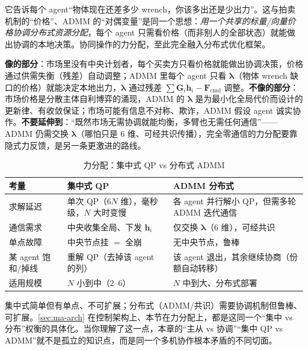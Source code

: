 \begin{insight}
它告诉每个 agent“物体现在还差多少 wrench，你该多出还是少出力”。这与拍卖机制的“价格”、ADMM 的“对偶变量”是同一个思想：\emph{用一个共享的标量/向量价格协调分布式资源分配}，每个 agent 只需看价格（而非别人的全部状态）就能做出协调的本地决策。协同操作的力分配，至此完全融入分布式优化框架。
\end{insight}

\begin{insight}
\textbf{像的部分}：市场里没有中央计划者，每个买卖方只看价格就能做出协调决策，价格通过供需失衡（残差）自动调整；ADMM 里每个 agent 只看 $\boldsymbol{\lambda}$（物体 wrench 缺口的价格）就能决定本地出力，$\boldsymbol{\lambda}$ 通过残差 $\sum\mathbf{G}_i\mathbf{h}_i-\mathbf{F}_{\text{cmd}}$ 调整。\textbf{不像的部分}：市场价格是分散主体自利博弈的涌现，ADMM 的 $\boldsymbol{\lambda}$ 是为最小化全局代价而设计的更新律、有收敛保证；市场可能有信息不对称、欺诈，ADMM 假设 agent 诚实协作。\textbf{不要延伸到}：“既然市场无需协调就能均衡，多臂也无需任何通信”——ADMM 仍需交换 $\boldsymbol{\lambda}$（哪怕只是 $6$ 维、可经共识传播），完全零通信的力分配要靠隐式力反馈，是另一条更激进的路线。
\end{insight}

\begin{table}[H]\centering\small
\caption{力分配：集中式 QP vs 分布式 ADMM}
\label{tab:ma-qp-vs-admm}
\begin{tabular}{lll}
\toprule
考量 & 集中式 QP & ADMM 分布式 \\
\midrule
求解延迟 & 单次 QP（$6N$ 维），毫秒级，$N$ 大时变慢 & 各 agent 并行解小 QP，但需多轮 ADMM 迭代通信 \\
通信需求 & 中央收集全局、下发 $\mathbf{h}_i$ & 仅交换 $\boldsymbol{\lambda}$（$6$ 维），可经共识 \\
单点故障 & 中央节点挂 $=$ 全崩 & 无中央节点，鲁棒 \\
某 agent 饱和/掉线 & 重解 QP（去掉该 agent 的列） & 该 agent 退出，其余继续协商（份额自动转移） \\
适用规模 & $N$ 小到中（$2$--$6$） & $N$ 中到大、分布式部署 \\
\bottomrule
\end{tabular}
\end{table}

\begin{insight}
集中式简单但有单点、不可扩展；分布式（ADMM/共识）需要协调机制但鲁棒、可扩展。\cref{sec:ma-arch} 在控制架构上、本节在力分配上，都是这同一个“集中 vs 分布”权衡的具体化。当你理解了这一点，本章的“主从 vs 协调”“集中 QP vs ADMM”就不是孤立的知识点，而是同一个多机协作根本矛盾的不同切面。
\end{insight}

